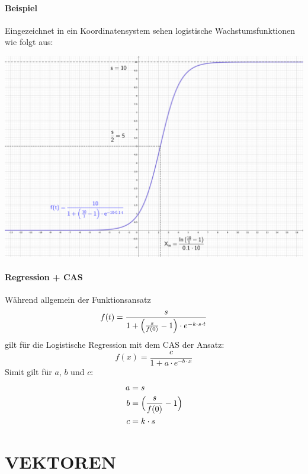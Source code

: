 \documentclass[a4paper,12pt]{article}
\begin{document}
\subsection{Beispiel}
Eingezeichnet in ein Koordinatensystem sehen logistische Wachstumsfunktionen wie folgt aus:
\begin{center}
\includegraphics[width=1\textwidth]{image3.png}
\end{center}
\subsection{Regression + CAS}
Während allgemein der Funktionsansatz
$$f(t) = \frac{s}{1+\Big{(} \frac{s}{f(0)} - 1\Big{)} \cdot e^{-k \cdot s \cdot t}}$$
gilt für die Logistische Regression mit dem CAS der Ansatz:
$$f(x) = \frac{c}{1 +  a\cdot e^{-b\cdot x}}$$
Simit gilt für $a$, $b$ und $c$:
\begin{equation*}
\begin{split}
a & = s\\
b & = \Big{(} \frac{s}{f(0)} - 1 \Big{)}\\
c & = k \cdot s
\end{split}
\end{equation*}
\pagebreak

%
%


\part{VEKTOREN}
\end{document}
